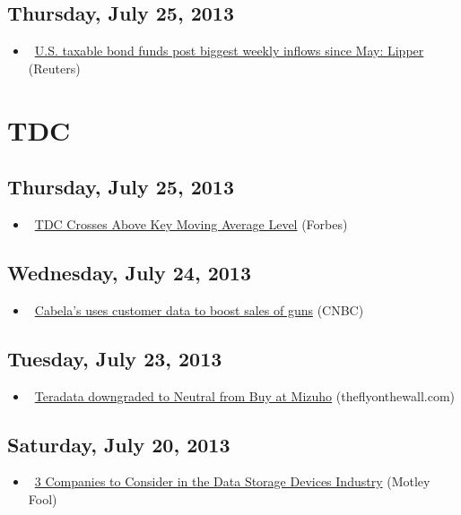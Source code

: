 \documentclass[11pt,asymmetric]{article}
\begin{document}
\subsection*{Thursday, July 25, 2013}
\begin{itemize}
\item\ \href{http://finance.yahoo.com/news/u-taxable-bond-funds-post-002846523.html}{U.S. taxable bond funds post biggest weekly inflows since May: Lipper} (Reuters)
\end{itemize}

\section*{TDC}

\subsection*{Thursday, July 25, 2013}
\begin{itemize}
\item\ \href{http://www.forbes.com/sites/dividendchannel/2013/07/25/tdc-crosses-above-key-moving-average-level/?partner=yahootix}{TDC Crosses Above Key Moving Average Level} (Forbes)
\end{itemize}
\subsection*{Wednesday, July 24, 2013}
\begin{itemize}
\item\ \href{http://www.cnbc.com/id/100910816?__source=yahoo%7Cfinance%7Cheadline%7Cheadline%7Cstory&par=yahoo&doc=100910816%7CCabela%27s+uses+customer+da}{Cabela's uses customer data to boost sales of guns} (CNBC)
\end{itemize}
\subsection*{Tuesday, July 23, 2013}
\begin{itemize}
\item\ \href{http://finance.yahoo.com/news/teradata-downgraded-neutral-buy-mizuho-103620070.html}{Teradata downgraded to Neutral from Buy at Mizuho} (theflyonthewall.com)
\end{itemize}
\subsection*{Saturday, July 20, 2013}
\begin{itemize}
\item\ \href{http://beta.fool.com/fundamentalyst/2013/07/19/three-companies-to-consider-in-the-data-storage-de/40696/?source=eogyholnk0000001}{3 Companies to Consider in the Data Storage Devices Industry} (Motley Fool)
\end{itemize}
\end{document}
